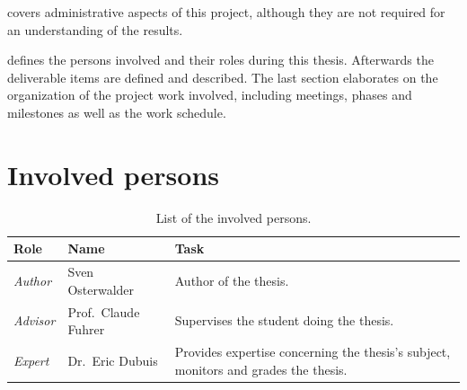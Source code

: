\documentclass[%
    a4paper,    %
    justified,  %
    nobib,      %
    openany     %
]{tufte-book}
\begin{document}
 covers administrative aspects of this project,
although they are not required for an understanding of the results.

 defines the persons involved and their roles
during this thesis. Afterwards the deliverable items are defined and described.
The last section elaborates on the organization of the project work involved,
including meetings, phases and milestones as well as the work schedule.

\section{Involved persons}
\label{sec:involved_persons}

\begin{table}[h]
  \caption{List of the involved persons.}
  \begin{tabularx}{\textwidth}{llX}
    \toprule
    \textbf{Role} & \textbf{Name} & \textbf{Task} \\
    \midrule
    \textit{Author}  & Sven Osterwalder\protect\footnotemark[1]{} & Author of the thesis.\\
    \textit{Advisor} & Prof.\ Claude Fuhrer\protect\footnotemark[2]{} & Supervises the student doing the thesis.\\
    \textit{Expert}  & Dr.\ Eric Dubuis\protect\footnotemark[3]{}     & Provides expertise concerning the thesis's subject, monitors and grades the thesis.\\
    \bottomrule
  \end{tabularx}
\end{table}
\end{document}
